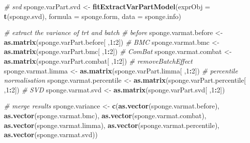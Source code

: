 \documentclass[]{book}
\newenvironment{Shaded}{\begin{snugshade}}{\end{snugshade}}
\newcommand{\KeywordTok}[1]{\textcolor[rgb]{0.13,0.29,0.53}{\textbf{#1}}}
\newcommand{\DataTypeTok}[1]{\textcolor[rgb]{0.13,0.29,0.53}{#1}}
\newcommand{\DecValTok}[1]{\textcolor[rgb]{0.00,0.00,0.81}{#1}}
\newcommand{\StringTok}[1]{\textcolor[rgb]{0.31,0.60,0.02}{#1}}
\newcommand{\CommentTok}[1]{\textcolor[rgb]{0.56,0.35,0.01}{\textit{#1}}}
\newcommand{\OperatorTok}[1]{\textcolor[rgb]{0.81,0.36,0.00}{\textbf{#1}}}
\newcommand{\NormalTok}[1]{#1}
\begin{document}
\begin{Shaded}
\begin{Highlighting}[]
\CommentTok{# svd}
\NormalTok{sponge.varPart.svd <-}\StringTok{ }\KeywordTok{fitExtractVarPartModel}\NormalTok{(}\DataTypeTok{exprObj =} \KeywordTok{t}\NormalTok{(sponge.svd), }
                                             \DataTypeTok{formula =}\NormalTok{ sponge.form, }
                                             \DataTypeTok{data =}\NormalTok{ sponge.info)}
\end{Highlighting}
\end{Shaded}

\begin{Shaded}
\begin{Highlighting}[]
\CommentTok{# extract the variance of trt and batch}
\CommentTok{# before}
\NormalTok{sponge.varmat.before <-}\StringTok{ }\KeywordTok{as.matrix}\NormalTok{(sponge.varPart.before[ ,}\DecValTok{1}\OperatorTok{:}\DecValTok{2}\NormalTok{])}
\CommentTok{# BMC}
\NormalTok{sponge.varmat.bmc <-}\StringTok{ }\KeywordTok{as.matrix}\NormalTok{(sponge.varPart.bmc[ ,}\DecValTok{1}\OperatorTok{:}\DecValTok{2}\NormalTok{])}
\CommentTok{# ComBat}
\NormalTok{sponge.varmat.combat <-}\StringTok{ }\KeywordTok{as.matrix}\NormalTok{(sponge.varPart.combat[ ,}\DecValTok{1}\OperatorTok{:}\DecValTok{2}\NormalTok{])}
\CommentTok{# removeBatchEffect}
\NormalTok{sponge.varmat.limma <-}\StringTok{ }\KeywordTok{as.matrix}\NormalTok{(sponge.varPart.limma[ ,}\DecValTok{1}\OperatorTok{:}\DecValTok{2}\NormalTok{])}
\CommentTok{# percentile normalisation}
\NormalTok{sponge.varmat.percentile <-}\StringTok{ }\KeywordTok{as.matrix}\NormalTok{(sponge.varPart.percentile[ ,}\DecValTok{1}\OperatorTok{:}\DecValTok{2}\NormalTok{])}
\CommentTok{# SVD}
\NormalTok{sponge.varmat.svd <-}\StringTok{ }\KeywordTok{as.matrix}\NormalTok{(sponge.varPart.svd[ ,}\DecValTok{1}\OperatorTok{:}\DecValTok{2}\NormalTok{])}

\CommentTok{# merge results}
\NormalTok{sponge.variance <-}\StringTok{ }\KeywordTok{c}\NormalTok{(}\KeywordTok{as.vector}\NormalTok{(sponge.varmat.before), }\KeywordTok{as.vector}\NormalTok{(sponge.varmat.bmc),}
                     \KeywordTok{as.vector}\NormalTok{(sponge.varmat.combat), }\KeywordTok{as.vector}\NormalTok{(sponge.varmat.limma),}
                     \KeywordTok{as.vector}\NormalTok{(sponge.varmat.percentile), }\KeywordTok{as.vector}\NormalTok{(sponge.varmat.svd))}


\end{Highlighting}
\end{Shaded}
\end{document}
